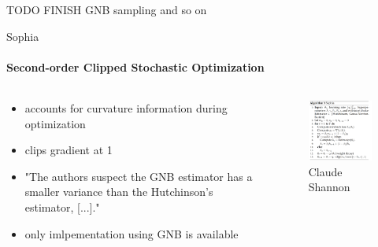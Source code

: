 \documentclass[
	11pt, %
	aspectratio=169, %
]{beamer}
\begin{document}
\begin{frame}
	TODO FINISH GNB sampling and so on
\end{frame}

\begin{frame}{Sophia}
	\framesubtitle{\textbf{S}econd-\textbf{o}rder Clip\textbf{p}ed Stoc\textbf{h}astic Opt\textbf{i}miz\textbf{a}tion}
	 \begin{columns}[c] %
		\begin{column}{0.45\textwidth} %
			\begin{itemize}
				\item accounts for curvature information during optimization
				\item clips gradient at 1
				\item "The authors suspect the GNB estimator has a smaller variance than the Hutchinson’s
				estimator, [...]."
				\item only imlpementation using GNB is available
			\end{itemize}
		\end{column}
		\begin{column}{0.55\textwidth} %
        	\begin{figure}
        	    \centering
                \includegraphics[width=6.5cm]{figures/sophia_algo.png}
        	    \caption*{Claude Shannon}
        	\end{figure}
		\end{column}
	\end{columns}
\end{frame}
\end{document}
